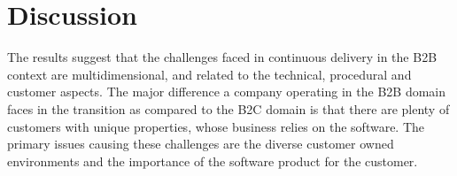 \documentclass[lnbip]{svmultln}
\begin{document}




\section{Discussion}
The results suggest that the challenges faced in continuous delivery in the B2B context are multidimensional, and related to the technical, procedural and customer aspects. The major difference a company operating in the B2B domain faces in the transition as compared to the B2C domain is that there are plenty of customers with unique properties, whose business relies on the software. The primary issues causing these challenges are the diverse customer owned environments and the importance of the software product for the customer. 
\end{document}
